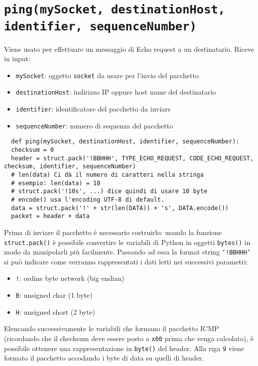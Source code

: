 \documentclass[a4paper,12pt]{report}
\begin{document}
\section{\texttt{ping(mySocket, destinationHost,\\ identifier, sequenceNumber)}}
Viene usato per effettuare un messaggio di Echo request a un destinatario.
Riceve in input:
\begin{itemize} 
  \item \texttt{mySocket}: oggetto \texttt{socket} da usare per l'invio del pacchetto
  \item \texttt{destinationHost}: indirizzo IP oppure host name del destinatario
  \item \texttt{identifier}: identificatore del pacchetto da inviare
  \item \texttt{sequenceNumber}: numero di sequenza del pacchetto
\end{itemize}
\begin{verbatim}
  def ping(mySocket, destinationHost, identifier, sequenceNumber):
  checksum = 0
  header = struct.pack('!BBHHH', TYPE_ECHO_REQUEST, CODE_ECHO_REQUEST, checksum, identifier, sequenceNumber)
  # len(data) Ci dà il numero di caratteri nella stringa
  # esempio: len(data) = 10
  # struct.pack('!10s', ...) dice quindi di usare 10 byte
  # encode() usa l'encoding UTF-8 di default. 
  data = struct.pack('!' + str(len(DATA)) + 's', DATA.encode())
  packet = header + data
\end{verbatim}
Prima di inviare il pacchetto è necessario costruirlo: usando la funzione \texttt{struct.pack()} è possibile convertire le variabili di Python in oggetti \texttt{bytes()} in modo da manipolarli più facilmente.
%
Passando ad essa la format string \texttt{`!BBHHH'} si può indicare come verranno rappresentati i dati letti nei successivi parametri:
\begin{itemize}
  \item \texttt{!}: ordine byte network (big endian)
  \item \texttt{B}: unsigned char (1 byte)
  \item \texttt{H}: unsigned short (2 byte)
\end{itemize}
Elencando successivamente le variabili che formano il pacchetto ICMP (ricordando che il checksum deve essere posto a \texttt{x00} prima che venga calcolato), è possibile ottenere una rappresentazione in \texttt{byte()} del header.
%
Alla riga \texttt{9} viene formato il pacchetto accodando i byte di data su quelli di header.
\end{document}
